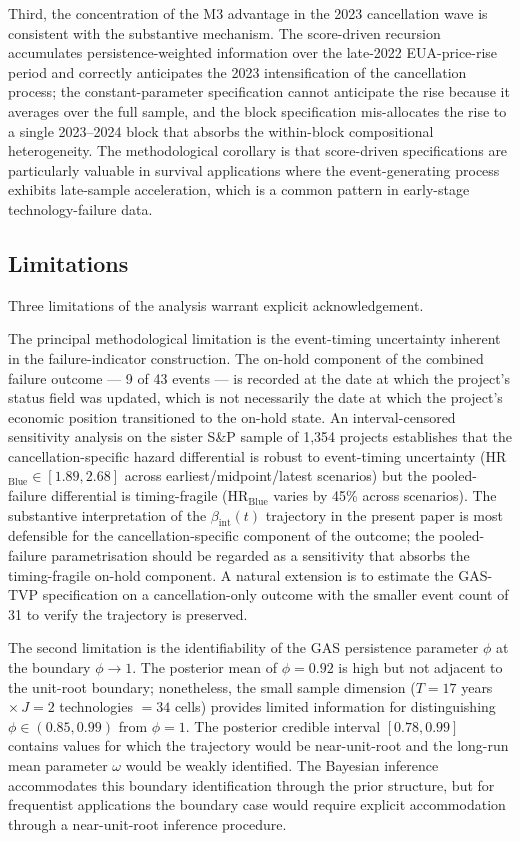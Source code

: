 \documentclass[12pt,a4paper]{article}
\newcommand{\bint}{\beta_{\text{int}}}
\theoremstyle{plain}
\theoremstyle{definition}
\begin{document}
Third, the concentration of the M3 advantage in the 2023 cancellation wave is consistent with the substantive mechanism. The score-driven recursion accumulates persistence-weighted information over the late-2022 EUA-price-rise period and correctly anticipates the 2023 intensification of the cancellation process; the constant-parameter specification cannot anticipate the rise because it averages over the full sample, and the block specification mis-allocates the rise to a single 2023--2024 block that absorbs the within-block compositional heterogeneity. The methodological corollary is that score-driven specifications are particularly valuable in survival applications where the event-generating process exhibits late-sample acceleration, which is a common pattern in early-stage technology-failure data.

\subsection{Limitations}

Three limitations of the analysis warrant explicit acknowledgement.

The principal methodological limitation is the event-timing uncertainty inherent in the failure-indicator construction. The on-hold component of the combined failure outcome --- 9 of 43 events --- is recorded at the date at which the project's status field was updated, which is not necessarily the date at which the project's economic position transitioned to the on-hold state. An interval-censored sensitivity analysis on the sister S\&P sample of 1{,}354 projects \citep{sun2006statistical} establishes that the cancellation-specific hazard differential is robust to event-timing uncertainty (HR$_{\text{Blue}} \in [1.89, 2.68]$ across earliest/midpoint/latest scenarios) but the pooled-failure differential is timing-fragile (HR$_{\text{Blue}}$ varies by 45\% across scenarios). The substantive interpretation of the $\bint(t)$ trajectory in the present paper is most defensible for the cancellation-specific component of the outcome; the pooled-failure parametrisation should be regarded as a sensitivity that absorbs the timing-fragile on-hold component. A natural extension is to estimate the GAS-TVP specification on a cancellation-only outcome with the smaller event count of 31 to verify the trajectory is preserved.

The second limitation is the identifiability of the GAS persistence parameter $\phi$ at the boundary $\phi \to 1$. The posterior mean of $\phi = 0.92$ is high but not adjacent to the unit-root boundary; nonetheless, the small sample dimension ($T = 17$ years $\times \, J = 2$ technologies $= 34$ cells) provides limited information for distinguishing $\phi \in (0.85, 0.99)$ from $\phi = 1$. The posterior credible interval $[0.78, 0.99]$ contains values for which the trajectory would be near-unit-root and the long-run mean parameter $\omega$ would be weakly identified. The Bayesian inference accommodates this boundary identification through the prior structure, but for frequentist applications the boundary case would require explicit accommodation through a near-unit-root inference procedure.
\end{document}
